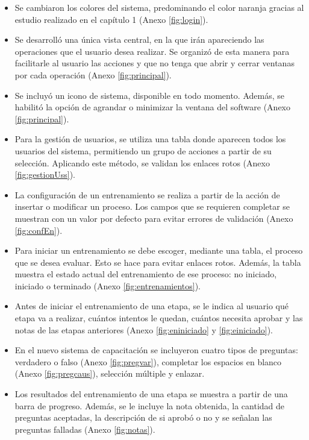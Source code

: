 \begin{itemize}
\item Se cambiaron los colores del sistema, predominando el color naranja gracias al estudio realizado en el capítulo 1 (Anexo \ref{fig:login}).
\item Se desarrolló una única vista central, en la que irán apareciendo las operaciones que el usuario desea realizar. Se organizó de esta manera para facilitarle al usuario las acciones y que no tenga que abrir y cerrar ventanas por cada operación (Anexo \ref{fig:principal}).
\item Se incluyó un icono de sistema, disponible en todo momento. Además, se habilitó la opción de agrandar o minimizar la ventana del software (Anexo \ref{fig:principal}).
\item Para la gestión de usuarios, se utiliza una tabla donde aparecen todos los usuarios del sistema, permitiendo un grupo de acciones a partir de su selección. Aplicando este método, se validan los enlaces rotos (Anexo \ref{fig:gestionUss}).
\item La configuración de un entrenamiento se realiza a partir de la acción de insertar o modificar un proceso. Los campos que se requieren completar se muestran con un valor por defecto para evitar errores de validación (Anexo \ref{fig:confEn}).
\item Para iniciar un entrenamiento se debe escoger, mediante una tabla, el proceso que se desea evaluar. Esto se hace para evitar enlaces rotos. Además, la tabla muestra el estado actual del entrenamiento de ese proceso: no iniciado, iniciado o terminado (Anexo \ref{fig:entrenamientos}).
\item Antes de iniciar el entrenamiento de una etapa, se le indica al usuario qué etapa va a realizar, cuántos intentos le quedan, cuántos necesita aprobar y las notas de las etapas anteriores (Anexo \ref{fig:eniniciado} y \ref{fig:einiciado}).
\item En el nuevo sistema de capacitación se incluyeron cuatro tipos de preguntas: verdadero o falso (Anexo \ref{fig:pregvar}), completar los espacios en blanco (Anexo \ref{fig:pregcaus}), selección múltiple y enlazar.
\item Los resultados del entrenamiento de una etapa se muestra a partir de una barra de progreso. Además, se le incluye la nota obtenida, la cantidad de preguntas aceptadas, la descripción de si aprobó o no y se señalan las preguntas falladas (Anexo \ref{fig:notas}).
\end{itemize}


